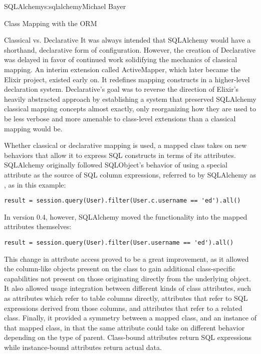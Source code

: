 \begin{aosachapter}{SQLAlchemy}{s:sqlalchemy}{Michael Bayer}
\begin{aosasect1}{Class Mapping with the ORM}
\begin{aosasect2}{Classical vs. Declarative}
It was always intended that SQLAlchemy would have a
shorthand, declarative form of configuration. However, the creation of Declarative
was delayed in favor of continued work solidifying the mechanics of classical mapping.
An interim extension called ActiveMapper, which
later became the Elixir project, existed early on. It redefines mapping constructs in a higher-level
declaration system.   Declarative's goal was to reverse the direction of Elixir's heavily abstracted
approach by establishing a system that preserved SQLAlchemy classical mapping concepts almost
exactly, only reorganizing how they are used to be less verbose and more amenable to
class-level extensions than a classical mapping would be.

Whether classical or declarative mapping is used, a mapped class takes on new
behaviors that allow it to express SQL constructs in terms of its attributes.
SQLAlchemy originally followed SQLObject's behavior of using a special
attribute as the source of SQL column expressions, referred to by SQLAlchemy
as , as in this example:

\begin{verbatim}
result = session.query(User).filter(User.c.username == 'ed').all()
\end{verbatim}

In version 0.4, however, SQLAlchemy moved the functionality into the mapped
attributes themselves:

\begin{verbatim}
result = session.query(User).filter(User.username == 'ed').all()
\end{verbatim}

This change in attribute access proved to be a great improvement, as it
allowed the column-like objects
present on the class to gain additional class-specific capabilities not
present on those originating directly from the underlying  object. It
also allowed usage integration between different kinds of class attributes,
such as attributes which refer to table columns directly, attributes that
refer to SQL expressions derived from those columns, and attributes that
refer to a related class.  Finally, it provided a symmetry between a mapped
class, and an instance of that mapped class, in that the same attribute
could take on different behavior depending on the type of parent.  Class-bound
attributes return SQL expressions while instance-bound attributes return
actual data.

\end{aosasect2}


\end{aosasect1}
\end{aosachapter}
